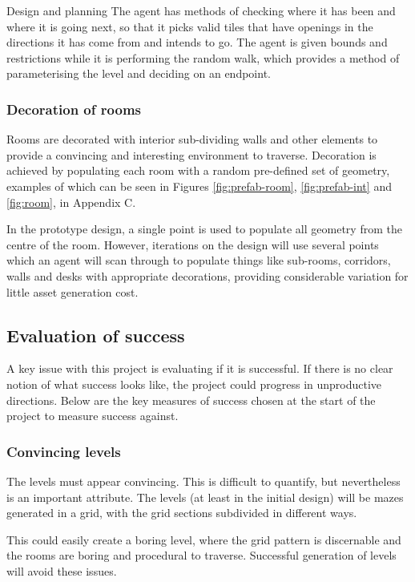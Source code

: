 \documentclass[final]{cmpreport}
\begin{document}
\begin{section}{Design and planning}
The agent has methods of checking where it has been and where it is going next, so that it picks valid tiles that have openings in the directions it has come from and intends to go. The agent is given bounds and restrictions while it is performing the random walk, which provides a method of parameterising the level and deciding on an endpoint. 

\subsubsection{Decoration of rooms}

Rooms are decorated with interior sub-dividing walls and other elements to provide a convincing and interesting environment to traverse. Decoration is achieved by populating each room with a random pre-defined set of geometry, examples of which can be seen in Figures \ref{fig:prefab-room}, \ref{fig:prefab-int} and \ref{fig:room}, in Appendix C. 

In the prototype design, a single point is used to populate all geometry from the centre of the room. However, iterations on the design will use several points which an agent will scan through to populate things like sub-rooms, corridors, walls and desks with appropriate decorations, providing considerable variation for little asset generation cost.

\subsection{Evaluation of success} \label{evalsuccess}
A key issue with this project is evaluating if it is successful. If there is no clear notion of what success looks like, the project could progress in unproductive directions. Below are the key measures of success chosen at the start of the project to measure success against.

\subsubsection{Convincing levels}
The levels must appear convincing. This is difficult to quantify, but nevertheless is an important attribute. The levels (at least in the initial design) will be mazes generated in a grid, with the grid sections subdivided in different ways.

This could easily create a boring level, where the grid pattern is discernable and the rooms are boring and procedural to traverse. Successful generation of levels will avoid these issues.


\end{section}
\end{document}
